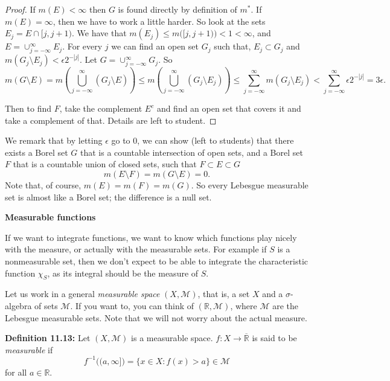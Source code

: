 \documentclass[12pt]{book}
\newcommand{\abs}[1]{\left\lvert {#1} \right\rvert}
\newcommand{\R}{{\mathbb{R}}}
\newcommand{\sM}{{\mathcal{M}}}
\theoremstyle{plain}
\theoremstyle{remark}
\theoremstyle{definition}
\theoremstyle{exercise}
\theoremstyle{example}
\begin{document}
\medskip

\begin{proof}
If $m(E) < \infty$ then $G$ is found directly by definition of $m^*$.
If $m(E) = \infty$, then we have to work a little harder.  So look at the
sets $E_j = E \cap [j,j+1)$.  We have that $m(E_j) \leq m\bigl([j,j+1)\bigr)
< 1 < \infty$, and $E = \cup_{j=-\infty}^\infty E_j$.  For every $j$ we can find an open set
$G_j$ such that, $E_j \subset G_j$ and $m(G_j \setminus E_j) < \epsilon
2^{-\abs{j}}$.
Let $G = \cup_{j=-\infty}^\infty G_j$.
So
$$
m(G \setminus E)
=
m\left( \bigcup_{j=-\infty}^\infty ( G_j\setminus E) \right)
\leq
m\left( \bigcup_{j=-\infty}^\infty ( G_j\setminus E_j) \right)
\leq
\sum_{j=-\infty}^\infty
m( G_j\setminus E_j)
<
\sum_{j=-\infty}^\infty
\epsilon 2^{-\abs{j}}
=
3\epsilon .
$$

Then to
find $F$, take the complement $E^c$ and find an open set that covers it
and take a complement of that.  Details are left to student.
\end{proof}

\medskip

We remark that by letting $\epsilon$ go to 0, we can show (left to
students) that there exists a Borel set $G$ that is a countable intersection
of open sets, and a Borel set $F$ that is a countable union of closed sets,
such that $F \subset E \subset G$
$$
m(E \setminus F) = m(G \setminus E) = 0 .
$$
Note that, of course, $m(E)=m(F)=m(G)$.
So every Lebesgue measurable set is almost like a Borel set; the difference
is a null set.
 
\medskip

\textbf{Measurable functions}

\medskip

If we want to integrate functions, we want to know which functions play
nicely with the measure, or actually with the measurable sets.
For example if $S$ is a nonmeasurable set, then we don't expect
to be able to integrate the characteristic function $\chi_S$, as its integral
should be the measure of $S$.

\medskip

Let us work in a general \emph{measurable space}
$(X,\sM)$, that is, a set $X$ and a $\sigma$-algebra of sets $\sM$.
If you want to, you can think of $(\R,\sM)$, where $\sM$ are the Lebesgue
measurable sets.  Note that we will not worry about the actual measure.

\medskip

\textbf{Definition 11.13:}
Let $(X,\sM)$ is a measurable space.  $f \colon X \to \overline{\R}$ is said
to be \emph{measurable} %
if
$$
f^{-1} \bigl( (a,\infty] \bigr)
=
\{ x \in X : f(x) > a \}
\in \sM
$$
for all $a \in \R$.
\end{document}
